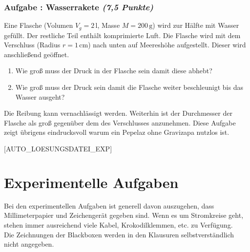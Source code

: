 \documentclass[12pt,a4paper]{article}
\newcommand{\unit}[1]{\,\mathrm{#1}}
\newenvironment{abcenum}{\renewcommand{\labelenumi}{(\alph{enumi})} \begin{enumerate}}{\end{enumerate}\renewcommand{\labelenumi}{\theenumi .}}
\newcounter{numlabel}
\newenvironment{problem}[2]{\stepcounter{numlabel} \vspace{1ex} \subsubsection*{Aufgabe \the\value{numlabel}: #1 \emph{(#2 Punkte)}} \renewcommand{\Currentlabel}{Aufgabe \the\value{numlabel}: #1}}{

}
\begin{document}
\begin{problem}{Wasserrakete}{7,5}
Eine Flasche (Volumen $V_g = 2  \unit{l}$, Masse $M = 200 \unit{g}$) wird zur Hälfte mit Wasser gefüllt. Der restliche Teil enthält komprimierte Luft. Die Flasche wird mit dem Verschluss (Radius $r = 1 \unit{cm}$) nach unten auf Meereshöhe aufgestellt. Dieser wird anschließend geöffnet.
\begin{abcenum}
\item Wie groß muss der Druck in der Flasche sein damit diese abhebt?
\item Wie groß muss der Druck sein damit die Flasche weiter beschleunigt bis das Wasser ausgeht?
\end{abcenum}
Die Reibung kann vernachlässigt werden. Weiterhin ist der Durchmesser der Flasche als groß gegenüber dem des Verschlusses anzunehmen. Diese Aufgabe zeigt übrigens eindrucksvoll warum ein Pepelaz ohne Gravizapa nutzlos ist.
\end{problem}

\setcounter{numlabel}{0}
[AUTO_LOESUNGSDATEI_EXP]



\section*{Experimentelle Aufgaben}

Bei den experimentellen Aufgaben ist generell davon auszugehen, dass Millimeterpapier und Zeichengerät gegeben sind. Wenn es um Stromkreise geht, stehen immer ausreichend viele Kabel, Krokodilklemmen, etc. zu Verfügung.\\
Die Zeichnungen der Blackboxen werden in den Klausuren selbstverständlich nicht angegeben.
\end{document}
